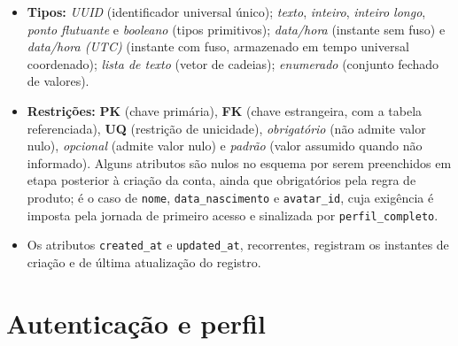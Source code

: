 \begin{apendicesenv}
    \begin{itemize}
        \item \textbf{Tipos:} \textit{UUID} (identificador universal único); \textit{texto}, \textit{inteiro}, \textit{inteiro longo}, \textit{ponto flutuante} e \textit{booleano} (tipos primitivos); \textit{data/hora} (instante sem fuso) e \textit{data/hora (UTC)} (instante com fuso, armazenado em tempo universal coordenado); \textit{lista de texto} (vetor de cadeias); \textit{enumerado} (conjunto fechado de valores).
        \item \textbf{Restrições:} \textbf{PK} (chave primária), \textbf{FK} (chave estrangeira, com a tabela referenciada), \textbf{UQ} (restrição de unicidade), \textit{obrigatório} (não admite valor nulo), \textit{opcional} (admite valor nulo) e \textit{padrão} (valor assumido quando não informado). Alguns atributos são nulos no esquema por serem preenchidos em etapa posterior à criação da conta, ainda que obrigatórios pela regra de produto; é o caso de \texttt{nome}, \texttt{data\_nascimento} e \texttt{avatar\_id}, cuja exigência é imposta pela jornada de primeiro acesso e sinalizada por \texttt{perfil\_completo}.
        \item Os atributos \texttt{created\_at} e \texttt{updated\_at}, recorrentes, registram os instantes de criação e de última atualização do registro.
    \end{itemize}

    \section*{Autenticação e perfil}


\end{apendicesenv}
